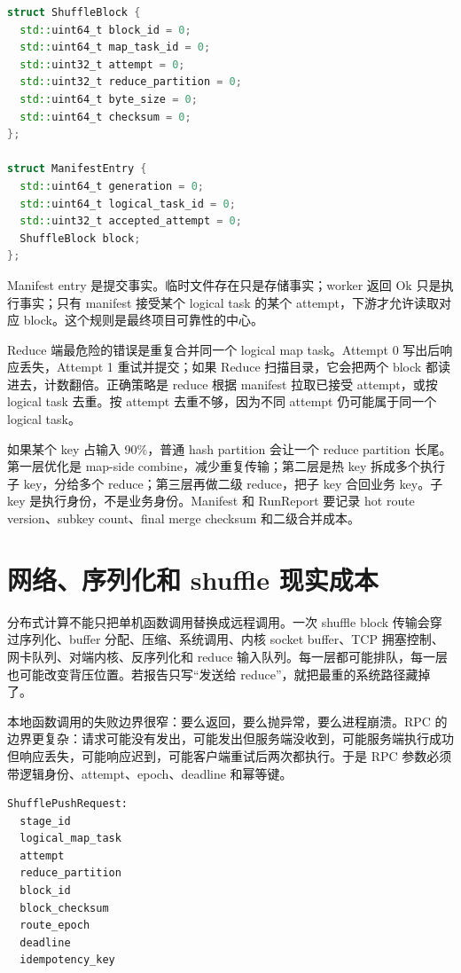 \begin{lstlisting}[language=C++,caption={Shuffle block 和 Manifest entry}]
struct ShuffleBlock {
  std::uint64_t block_id = 0;
  std::uint64_t map_task_id = 0;
  std::uint32_t attempt = 0;
  std::uint32_t reduce_partition = 0;
  std::uint64_t byte_size = 0;
  std::uint64_t checksum = 0;
};

struct ManifestEntry {
  std::uint64_t generation = 0;
  std::uint64_t logical_task_id = 0;
  std::uint32_t accepted_attempt = 0;
  ShuffleBlock block;
};
\end{lstlisting}

Manifest entry 是提交事实。临时文件存在只是存储事实；worker 返回 Ok 只是执行事实；只有 manifest 接受某个 logical task 的某个 attempt，下游才允许读取对应 block。这个规则是最终项目可靠性的中心。

Reduce 端最危险的错误是重复合并同一个 logical map task。Attempt 0 写出后响应丢失，Attempt 1 重试并提交；如果 Reduce 扫描目录，它会把两个 block 都读进去，计数翻倍。正确策略是 reduce 根据 manifest 拉取已接受 attempt，或按 logical task 去重。按 attempt 去重不够，因为不同 attempt 仍可能属于同一个 logical task。

如果某个 key 占输入 90\%，普通 hash partition 会让一个 reduce partition 长尾。第一层优化是 map-side combine，减少重复传输；第二层是热 key 拆成多个执行子 key，分给多个 reduce；第三层再做二级 reduce，把子 key 合回业务 key。子 key 是执行身份，不是业务身份。Manifest 和 RunReport 要记录 hot route version、subkey count、final merge checksum 和二级合并成本。

\section{网络、序列化和 shuffle 现实成本}

分布式计算不能只把单机函数调用替换成远程调用。一次 shuffle block 传输会穿过序列化、buffer 分配、压缩、系统调用、内核 socket buffer、TCP 拥塞控制、网卡队列、对端内核、反序列化和 reduce 输入队列。每一层都可能排队，每一层也可能改变背压位置。若报告只写“发送给 reduce”，就把最重的系统路径藏掉了。

本地函数调用的失败边界很窄：要么返回，要么抛异常，要么进程崩溃。RPC 的边界更复杂：请求可能没有发出，可能发出但服务端没收到，可能服务端执行成功但响应丢失，可能响应迟到，可能客户端重试后两次都执行。于是 RPC 参数必须带逻辑身份、attempt、epoch、deadline 和幂等键。

\begin{lstlisting}[numbers=none,caption={Shuffle RPC 的最小身份字段}]
ShufflePushRequest:
  stage_id
  logical_map_task
  attempt
  reduce_partition
  block_id
  block_checksum
  route_epoch
  deadline
  idempotency_key
\end{lstlisting}

